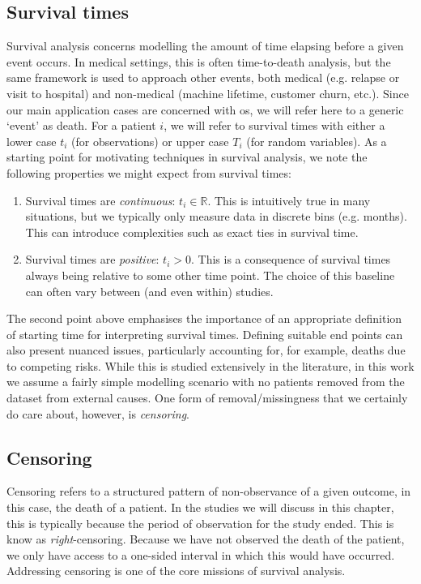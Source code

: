 \documentclass[../thesis.tex]{subfiles}
\begin{document}
\subsection{Survival times}
Survival analysis concerns modelling the amount of time elapsing before a given event occurs. In medical settings, this is often time-to-death analysis, but the same framework is used to approach other events, both medical (e.g. relapse or visit to hospital) and non-medical (machine lifetime, customer churn, etc.). Since our main application cases are concerned with \gls{os}, we will refer here to a generic `event' as death. For a patient $i$, we will refer to survival times with either a lower case $t_i$ (for observations) or upper case $T_i$ (for random variables). As a starting point for motivating techniques in survival analysis, we note the following properties we might expect from survival times:
\begin{enumerate}
    \item Survival times are \emph{continuous}: $t_i \in \mathbb{R}$. This is intuitively true in many situations, but we typically only measure data in discrete bins (e.g. months). This can introduce complexities such as exact ties in survival time.
    \item Survival times are \emph{positive}: $t_i > 0$. This is a consequence of survival times always being {relative to some other time point}. The choice of this baseline can often vary between (and even within) studies.
\end{enumerate}
The second point above emphasises the importance of an appropriate definition of starting time for interpreting survival times. Defining suitable end points can also present nuanced issues, particularly accounting for, for example, deaths due to competing risks. While this is studied extensively in the literature, in this work we assume a fairly simple modelling scenario with no patients removed from the dataset from external causes. One form of removal/missingness that we certainly do care about, however, is \emph{censoring}. 

\subsection{Censoring}
Censoring refers to a structured pattern of non-observance of a given outcome, in this case, the death of a patient. In the studies we will discuss in this chapter, this is typically because the period of observation for the study ended. This is know as \emph{right}-censoring. Because we have not observed the death of the patient, we only have access to a one-sided interval in which this would have occurred. Addressing censoring is one of the core missions of survival analysis.
\end{document}

